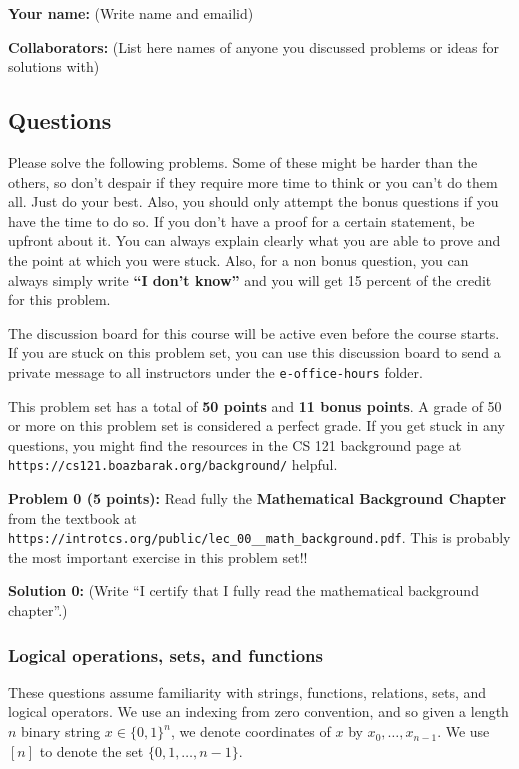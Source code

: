 \documentclass[11pt]{article}
\begin{document}
\textbf{Your name:} (Write name and emailid)

\textbf{Collaborators:} (List here names of anyone you discussed
problems or ideas for solutions with)


\newpage


\subsection*{Questions}\label{questions}

Please solve the following problems. Some of these might be harder than
the others, so don't despair if they require more time to think or you
can't do them all. Just do your best. Also, you should only attempt the
bonus questions if you have the time to do so. If you don't have a proof
for a certain statement, be upfront about it. You can always explain
clearly what you are able to prove and the point at which you were
stuck. Also, for a non bonus question, you can always simply write
\textbf{``I don't know''} and you will get 15 percent of the credit for
this problem.

The discussion board for this course will be active even before the course
starts. If you are stuck on this problem set, you can use this discussion board to send
a private message to all instructors under the \texttt{e-office-hours}
folder.

This problem set has a total of \textbf{50 points} and \textbf{11 bonus
points}. A grade of 50 or more on this problem set is considered a
perfect grade. If you get stuck in any questions, you might find the
resources in the CS 121 background page at {\tt https://cs121.boazbarak.org/background/} helpful.

\textbf{Problem 0 (5 points):} Read fully the \textbf{Mathematical
Background Chapter} from the textbook at 
{\tt https://introtcs.org/public/lec\_00\_\_math\_background.pdf}.
This is probably the most important exercise in this problem set!!

\textbf{Solution 0:} (Write ``I certify that I fully read the
mathematical background chapter''.)


\subsubsection{Logical operations, sets, and
functions}\label{logical-operations-sets-and-functions}

These questions assume familiarity with strings, functions, relations,
sets, and logical operators. We use an indexing from zero convention,
and so given a length \(n\) binary string \(x\in \{0,1\}^n\), we denote
coordinates of \(x\) by \(x_0,\ldots,x_{n-1}\). We use \([n]\) to denote
the set \(\{0,1,\ldots,n-1\}\).
\end{document}
